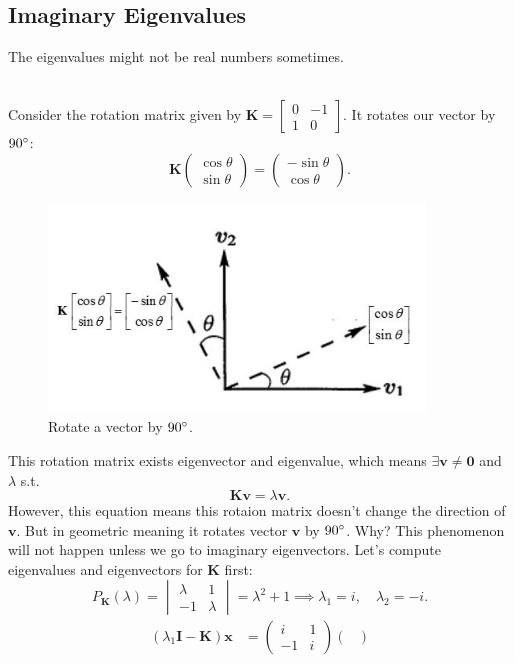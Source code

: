 \subsection{Imaginary Eigenvalues}
The eigenvalues might not be real numbers sometimes.
\begin{example}\qquad\\
Consider the rotation matrix given by $\bm K=\begin{bmatrix}
0&-1\\1&0
\end{bmatrix}$. It rotates our vector by $90^\circ$:
\[
\bm K\begin{pmatrix}
\cos\theta\\\sin\theta
\end{pmatrix}=\begin{pmatrix}
-\sin\theta\\\cos\theta
\end{pmatrix}.
\]
\begin{figure}[H]
\centering
\includegraphics[width=10cm]{week6/rotation}
\caption{Rotate a vector by $90^\circ$.}
\end{figure}
This rotation matrix exists eigenvector and eigenvalue, which means $\exists\bm v\ne\bm 0$ and $\lambda$ s.t. \[\bm K\bm v=\lambda\bm v.\] 
However, this equation means this rotaion matrix doesn't change the direction of $\bm v$. But in geometric meaning it rotates vector $\bm v$ by $90^\circ$. Why? This phenomenon will not happen unless we go to imaginary eigenvectors. Let's compute eigenvalues and eigenvectors for $\bm K$ first:
\[
P_{\bm K}(\lambda)=\begin{vmatrix}
\lambda&1\\-1&\lambda\end{vmatrix}
=\lambda^2+1
\implies
\lambda_1=i,\quad\lambda_2=-i.
\]
\begin{align*}
(\lambda_1\bm I-\bm K)\bm x&=\begin{pmatrix}
i&1\\-1&i
\end{pmatrix}\begin{pmatrix}

\end{pmatrix}
\end{align*}
\end{example}
